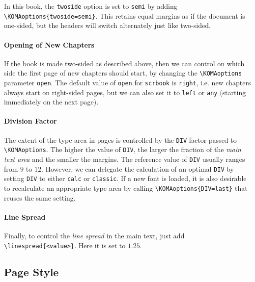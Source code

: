 In this book, the \texttt{twoside} option is set to \texttt{semi} by adding \texttt{\textbackslash KOMAoptions\allowbreak\{twoside=semi\}}. This retains equal margins as if the document is one-sided, but the headers will switch alternately just like two-sided.

\paragraph{Opening of New Chapters} If the book is made two-sided as described above, then we can control on which side the first page of new chapters should start, by changing the \texttt{\textbackslash KOMAoptions} parameter \texttt{open}. The default value of \texttt{open} for \texttt{scrbook} is \texttt{right}, i.e. new chapters always start on right-sided pages, but we can also set it to \texttt{left} or \texttt{any} (starting immediately on the next page).

\paragraph{Division Factor}
The extent of the type area in pages is controlled by the \texttt{DIV} factor passed to \texttt{\textbackslash KOMAoptions}. The higher the value of \texttt{DIV}, the larger the fraction of the \textit{main text area} and the smaller the margins. The reference value of \texttt{DIV} usually ranges from $9$ to $12$. However, we can delegate the calculation of an optimal \texttt{DIV} by setting \texttt{DIV} to either \texttt{calc} or \texttt{classic}. If a new font is loaded, it is also desirable to recalculate an appropriate type area by calling \texttt{\textbackslash KOMAoptions\{DIV=last\}} that reuses the same setting.

\paragraph{Line Spread}
Finally, to control the \textit{line spread} in the main text, just add \texttt{\textbackslash linespread\{<value>\}}. Here it is set to $1.25$.

\subsection{Page Style}


